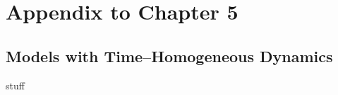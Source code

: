 \chapter{Appendix to Chapter 5}
\label{chap:appendix_ch4}

\section{Models with Time--Homogeneous Dynamics}
\label{sec:flu_constFOI}
stuff